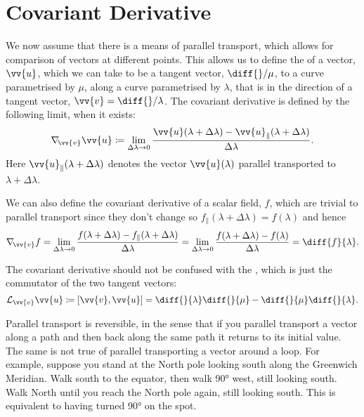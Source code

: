 \documentclass[fleqn]{NotesClass}
\newcommand*{\covariantDerivative}[1]{\nabla_{\!#1}}
\begin{document}
    \section{Covariant Derivative}\label{sec:covariant derivative}
    We now assume that there is a means of parallel transport, which allows for comparison of vectors at different points.
    This allows us to define the  of a vector, \(\vv{u}\), which we can take to be a tangent vector, \(\diff{}/{\mu}\), to a curve parametrised by \(\mu\), along a curve parametrised by \(\lambda\), that is in the direction of a tangent vector, \(\vv{v} = \diff{}/{\lambda}\).
    The covariant derivative is defined by the following limit, when it exists:
    \begin{equation}
        \covariantDerivative{\vv{v}} \vv{u} \coloneqq \lim_{\Delta \lambda \to 0} \frac{\vv{u}(\lambda + \Delta \lambda) - \vv{u}_{\|}(\lambda + \Delta \lambda)}{\Delta \lambda}.
    \end{equation}
    Here \(\vv{u}_{\|}(\lambda + \Delta \lambda)\) denotes the vector \(\vv{u}(\lambda)\) parallel transported to \(\lambda + \Delta\lambda\).
    
    We can also define the covariant derivative of a scalar field, \(f\), which are trivial to parallel transport since they don't change so \(f_{\|}(\lambda + \Delta \lambda) = f(\lambda)\) and hence
    \begin{equation}
        \covariantDerivative{\vv{v}} f = \lim_{\Delta \lambda \to 0} \frac{f(\lambda + \Delta \lambda) - f_{\|}(\lambda + \Delta \lambda)}{\Delta \lambda} = \lim_{\Delta \lambda \to 0} \frac{f(\lambda + \Delta \lambda) - f(\lambda)}{\Delta \lambda} = \diff{f}{\lambda}.
    \end{equation}
    
    The covariant derivative should not be confused with the , which is just the commutator of the two tangent vectors:
    \begin{equation}
        \mathcal{L}_{\vv{v}} \vv{u} \coloneqq [\vv{v}, \vv{u}] = \diff{}{\lambda}\diff{}{\mu} - \diff{}{\mu}\diff{}{\lambda}.
    \end{equation}

    Parallel transport is reversible, in the sense that if you parallel transport a vector along a path and then back along the same path it returns to its initial value.
    The same is not true of parallel transporting a vector around a loop.
    For example, suppose you stand at the North pole looking south along the Greenwich Meridian.
    Walk south to the equator, then walk \ang{90} west, still looking south.
    Walk North until you reach the North pole again, still looking south.
    This is equivalent to having turned \ang{90} on the spot.
    
\end{document}

